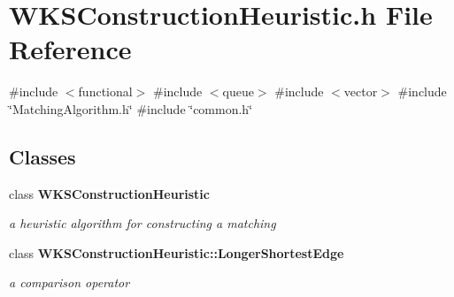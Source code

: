 \section{W\+K\+S\+Construction\+Heuristic.\+h File Reference}
\label{WKSConstructionHeuristic_8h}
{\ttfamily \#include $<$functional$>$}\newline
{\ttfamily \#include $<$queue$>$}\newline
{\ttfamily \#include $<$vector$>$}\newline
{\ttfamily \#include \char`\"{}Matching\+Algorithm.\+h\char`\"{}}\newline
{\ttfamily \#include \char`\"{}common.\+h\char`\"{}}\newline
\subsection*{Classes}
\begin{DoxyCompactItemize}
\item 
class \textbf{ W\+K\+S\+Construction\+Heuristic}
\begin{DoxyCompactList}\small\item\em a heuristic algorithm for constructing a matching \end{DoxyCompactList}\item 
class \textbf{ W\+K\+S\+Construction\+Heuristic\+::\+Longer\+Shortest\+Edge}
\begin{DoxyCompactList}\small\item\em a comparison operator \end{DoxyCompactList}\end{DoxyCompactItemize}
